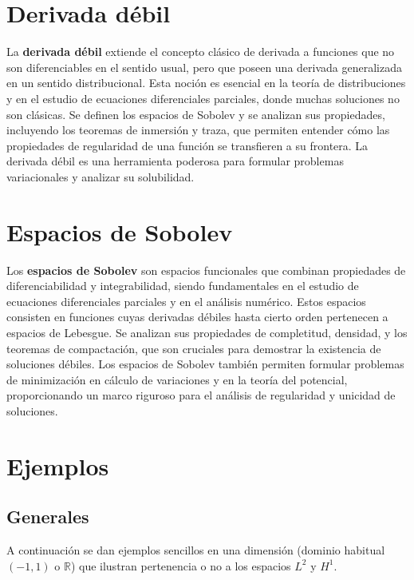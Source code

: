 \documentclass[12pt]{book}
\theoremstyle{definition}
\theoremstyle{plain}
\theoremstyle{remark}
\begin{document}
\section{Derivada débil}
La \textbf{derivada débil} extiende el concepto clásico de derivada a funciones que no son diferenciables en el sentido usual, pero que poseen una derivada generalizada en un sentido distribucional. Esta noción es esencial en la teoría de distribuciones y en el estudio de ecuaciones diferenciales parciales, donde muchas soluciones no son clásicas. Se definen los espacios de Sobolev y se analizan sus propiedades, incluyendo los teoremas de inmersión y traza, que permiten entender cómo las propiedades de regularidad de una función se transfieren a su frontera. La derivada débil es una herramienta poderosa para formular problemas variacionales y analizar su solubilidad.

\section{Espacios de Sobolev}
Los \textbf{espacios de Sobolev} son espacios funcionales que combinan propiedades de diferenciabilidad y integrabilidad, siendo fundamentales en el estudio de ecuaciones diferenciales parciales y en el análisis numérico. Estos espacios consisten en funciones cuyas derivadas débiles hasta cierto orden pertenecen a espacios de Lebesgue. Se analizan sus propiedades de completitud, densidad, y los teoremas de compactación, que son cruciales para demostrar la existencia de soluciones débiles. Los espacios de Sobolev también permiten formular problemas de minimización en cálculo de variaciones y en la teoría del potencial, proporcionando un marco riguroso para el análisis de regularidad y unicidad de soluciones.

\section{Ejemplos} %

\subsection{Generales}

A continuación se dan ejemplos sencillos en una dimensión (dominio habitual \((-1,1)\) o \(\mathbb{R}\)) que ilustran pertenencia o no a los espacios \(L^{2}\) y \(H^{1}\).
\end{document}
